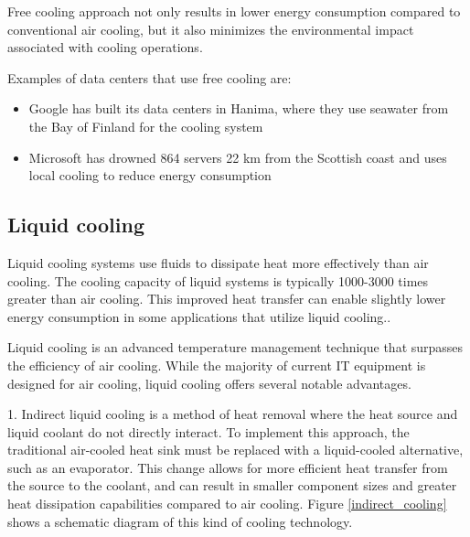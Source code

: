 \documentclass[
  a4paper,  %
  twoside,  %
  bibliography=totoc,
  headsepline,
  cleardoublepage=empty,
  parskip=half,
  draft=false
]{scrbook}
\begin{document}
Free cooling approach not only results in lower energy consumption compared to conventional air cooling, but it also minimizes the environmental impact associated with cooling operations\cite{datacenterdynamicsExploringData}.

Examples of data centers that use free cooling are:
\begin{itemize}
	\item Google has built its data centers in Hanima, where they use seawater from the Bay of Finland for the cooling system\cite{datacentersGoogleData}
	\item Microsoft has drowned 864 servers 22 km from the Scottish coast and uses local cooling to reduce energy consumption\cite{qzNewestGreentech}
\end{itemize}



\subsection{Liquid cooling}

Liquid cooling systems use fluids to dissipate heat more effectively than air cooling. The cooling capacity of liquid systems is typically 1000-3000 times greater than air cooling. This improved heat transfer can enable slightly lower energy consumption in some applications that utilize liquid cooling.\cite{ZHU2023104322}.



Liquid cooling is an advanced temperature management technique that surpasses the efficiency of air cooling. While the majority of current IT equipment is designed for air cooling, liquid cooling offers several notable advantages\cite{xu2023thermal}.

1. Indirect liquid cooling is a method of heat removal where the heat source and liquid coolant do not directly interact. To implement this approach, the traditional air-cooled heat sink must be replaced with a liquid-cooled alternative, such as an evaporator. This change allows for more efficient heat transfer from the source to the coolant, and can result in smaller component sizes and greater heat dissipation capabilities compared to air cooling\cite{khalaj2017review}. Figure \ref{indirect_cooling} shows a schematic diagram of this kind of cooling technology.
\end{document}
